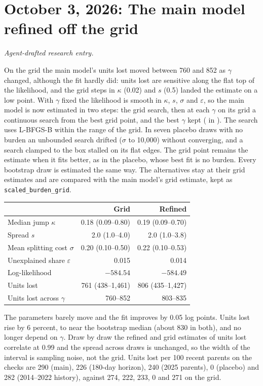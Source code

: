 \clearpage
\section*{October 3, 2026: The main model refined off the grid}
\textit{Agent-drafted research entry.}

On the grid the main model's units lost moved between 760 and 852 as $\gamma$
changed, although the fit hardly did: units lost are sensitive along the flat
top of the likelihood, and the grid steps in $\kappa$ (0.02) and $s$ (0.5)
landed the estimate on a low point. With $\gamma$ fixed the likelihood is
smooth in $\kappa$, $s$, $\sigma$ and $\varepsilon$, so the main model is now
estimated in two steps: the grid search, then at each $\gamma$ on its grid a
continuous search from the best grid point, and the best $\gamma$ kept
( in ). The search uses L-BFGS-B
within the range of the grid. In seven placebo draws with no burden an
unbounded search drifted ($\sigma$ to 10,000) without converging, and a
search clamped to the box stalled on its flat edges. The grid point remains
the estimate when it fits better, as in the placebo, whose best fit is no
burden. Every bootstrap draw is estimated the same way. The alternatives stay
at their grid estimates and are compared with the main model's grid estimate,
kept as \texttt{scaled\_burden\_grid}.

\begin{center}
\small
\begin{tabular}{lrr}
\hline
 & Grid & Refined \\
\hline
Median jump $\kappa$ & 0.18 (0.09--0.80) & 0.19 (0.09--0.70) \\
Spread $s$ & 2.0 (1.0--4.0) & 2.0 (1.0--3.8) \\
Mean splitting cost $\sigma$ & 0.20 (0.10--0.50) & 0.22 (0.10--0.53) \\
Unexplained share $\varepsilon$ & 0.015 & 0.014 \\
Log-likelihood & $-584.54$ & $-584.49$ \\
Units lost & 761 (438--1,461) & 806 (435--1,427) \\
Units lost across $\gamma$ & 760--852 & 803--835 \\
\hline
\end{tabular}
\end{center}

The parameters barely move and the fit improves by 0.05 log points. Units
lost rise by 6 percent, to near the bootstrap median (about 830 in both), and no
longer depend on $\gamma$. Draw by draw the refined and grid estimates of units
lost correlate at 0.99 and the spread across draws is unchanged, so the width
of the interval is sampling noise, not the grid. Units lost per 100 recent
parents on the checks are 290 (main), 226 (180-day horizon), 240 (2025
parents), 0 (placebo) and 282 (2014--2022 history), against 274, 222, 233, 0
and 271 on the grid.

